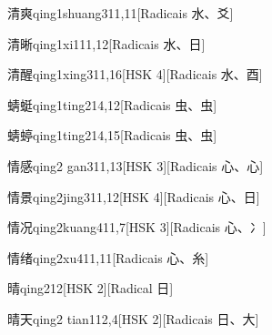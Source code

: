 \begin{entry}{清爽}{qing1shuang3}{11,11}[Radicais ⽔、⽘]
\end{entry}

\begin{entry}{清晰}{qing1xi1}{11,12}[Radicais ⽔、⽇]
\end{entry}

\begin{entry}{清醒}{qing1xing3}{11,16}[HSK 4][Radicais ⽔、⾣]
\end{entry}

\begin{entry}{蜻蜓}{qing1ting2}{14,12}[Radicais ⾍、⾍]
\end{entry}

\begin{entry}{蜻蝏}{qing1ting2}{14,15}[Radicais ⾍、⾍]
\end{entry}

\begin{entry}{情感}{qing2 gan3}{11,13}[HSK 3][Radicais ⼼、⼼]
\end{entry}

\begin{entry}{情景}{qing2jing3}{11,12}[HSK 4][Radicais ⼼、⽇]
\end{entry}

\begin{entry}{情况}{qing2kuang4}{11,7}[HSK 3][Radicais ⼼、⼎]
\end{entry}

\begin{entry}{情绪}{qing2xu4}{11,11}[Radicais ⼼、⽷]
\end{entry}

\begin{entry}{晴}{qing2}{12}[HSK 2][Radical ⽇]
\end{entry}

\begin{entry}{晴天}{qing2 tian1}{12,4}[HSK 2][Radicais ⽇、⼤]
\end{entry}

